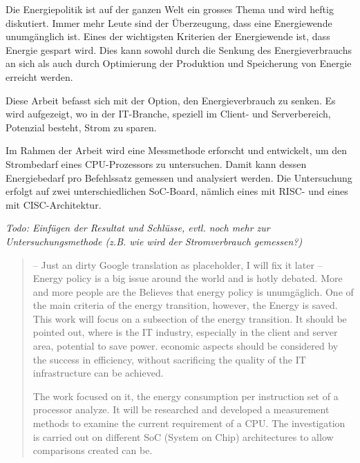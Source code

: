 \begin{zusammenfassung}

Die Energiepolitik ist auf der ganzen Welt ein grosses Thema und wird heftig diskutiert. Immer mehr Leute sind der Überzeugung, dass eine Energiewende unumgänglich ist. Eines der wichtigsten Kriterien der Energiewende ist, dass Energie gespart wird. Dies kann sowohl durch die Senkung des Energieverbrauchs an sich als auch durch Optimierung der Produktion und Speicherung von Energie erreicht werden.
\par
Diese Arbeit befasst sich mit der Option, den Energieverbrauch zu senken. Es wird aufgezeigt, wo in der IT-Branche, speziell im Client- und Serverbereich, Potenzial besteht, Strom zu sparen.
\par
Im Rahmen der Arbeit wird eine Messmethode erforscht und entwickelt, um den Strombedarf eines CPU-Prozessors zu untersuchen. Damit kann dessen Energiebedarf pro Befehlssatz gemessen und analysiert werden. Die Untersuchung erfolgt auf zwei unterschiedlichen SoC-Board, nämlich eines mit RISC- und eines mit CISC-Architektur.

\textit{Todo: Einfügen der Resultat und Schlüsse, evtl. noch mehr zur Untersuchungsmethode (z.B. wie wird der Stromverbrauch gemessen?)}


\end{zusammenfassung}

\begin{abstract} 

-- Just an dirty Google translation as placeholder, I will fix it later --
Energy policy is a big issue around the world and is hotly debated. More and more people are the
Believes that energy policy is unumgäglich. One of the main criteria of the energy transition, however, the
Energy is saved. This work will focus on a subsection of the energy transition. It should be pointed out,
where is the IT industry, especially in the client and server area, potential to save power. economic aspects
should be considered by the success in efficiency, without sacrificing the quality of the IT infrastructure
can be achieved.
\par
The work focused on it, the energy consumption per instruction set of a processor
analyze. It will be researched and developed a measurement methods to examine the current requirement of a CPU.
The investigation is carried out on different SoC (System on Chip) architectures to allow comparisons created
can be.

\end{abstract}

